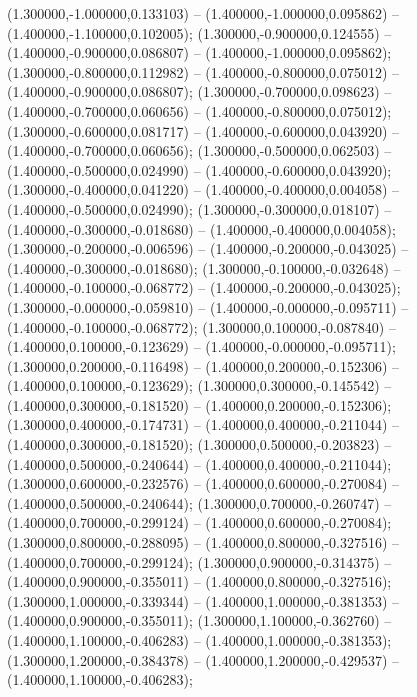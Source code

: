  (1.300000,-1.000000,0.133103) -- (1.400000,-1.000000,0.095862) -- (1.400000,-1.100000,0.102005);
 (1.300000,-0.900000,0.124555) -- (1.400000,-0.900000,0.086807) -- (1.400000,-1.000000,0.095862);
 (1.300000,-0.800000,0.112982) -- (1.400000,-0.800000,0.075012) -- (1.400000,-0.900000,0.086807);
 (1.300000,-0.700000,0.098623) -- (1.400000,-0.700000,0.060656) -- (1.400000,-0.800000,0.075012);
 (1.300000,-0.600000,0.081717) -- (1.400000,-0.600000,0.043920) -- (1.400000,-0.700000,0.060656);
 (1.300000,-0.500000,0.062503) -- (1.400000,-0.500000,0.024990) -- (1.400000,-0.600000,0.043920);
 (1.300000,-0.400000,0.041220) -- (1.400000,-0.400000,0.004058) -- (1.400000,-0.500000,0.024990);
 (1.300000,-0.300000,0.018107) -- (1.400000,-0.300000,-0.018680) -- (1.400000,-0.400000,0.004058);
 (1.300000,-0.200000,-0.006596) -- (1.400000,-0.200000,-0.043025) -- (1.400000,-0.300000,-0.018680);
 (1.300000,-0.100000,-0.032648) -- (1.400000,-0.100000,-0.068772) -- (1.400000,-0.200000,-0.043025);
 (1.300000,-0.000000,-0.059810) -- (1.400000,-0.000000,-0.095711) -- (1.400000,-0.100000,-0.068772);
 (1.300000,0.100000,-0.087840) -- (1.400000,0.100000,-0.123629) -- (1.400000,-0.000000,-0.095711);
 (1.300000,0.200000,-0.116498) -- (1.400000,0.200000,-0.152306) -- (1.400000,0.100000,-0.123629);
 (1.300000,0.300000,-0.145542) -- (1.400000,0.300000,-0.181520) -- (1.400000,0.200000,-0.152306);
 (1.300000,0.400000,-0.174731) -- (1.400000,0.400000,-0.211044) -- (1.400000,0.300000,-0.181520);
 (1.300000,0.500000,-0.203823) -- (1.400000,0.500000,-0.240644) -- (1.400000,0.400000,-0.211044);
 (1.300000,0.600000,-0.232576) -- (1.400000,0.600000,-0.270084) -- (1.400000,0.500000,-0.240644);
 (1.300000,0.700000,-0.260747) -- (1.400000,0.700000,-0.299124) -- (1.400000,0.600000,-0.270084);
 (1.300000,0.800000,-0.288095) -- (1.400000,0.800000,-0.327516) -- (1.400000,0.700000,-0.299124);
 (1.300000,0.900000,-0.314375) -- (1.400000,0.900000,-0.355011) -- (1.400000,0.800000,-0.327516);
 (1.300000,1.000000,-0.339344) -- (1.400000,1.000000,-0.381353) -- (1.400000,0.900000,-0.355011);
 (1.300000,1.100000,-0.362760) -- (1.400000,1.100000,-0.406283) -- (1.400000,1.000000,-0.381353);
 (1.300000,1.200000,-0.384378) -- (1.400000,1.200000,-0.429537) -- (1.400000,1.100000,-0.406283);
